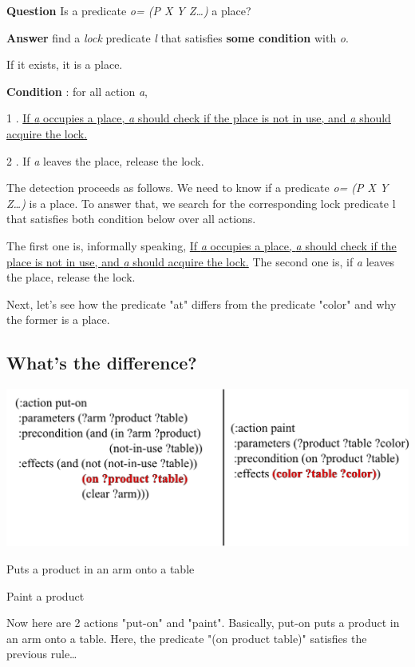 \textbf{Question} Is a predicate \emph{o= (P X Y Z\ldots{})} a place?

\textbf{Answer} find a \emph{lock} predicate \emph{l} that satisfies \textbf{some condition} with \emph{o}.

If it exists, it is a place.

\textbf{Condition} : for all action \emph{a},

1 . \uline{If \emph{a} occupies a place, \emph{a} should check if the place is not in use, and \emph{a}
should acquire the lock.}

2 . If \emph{a} leaves the place, release the lock.

\begin{resume}
The detection proceeds as follows.
We need to know if a predicate \emph{o= (P X Y Z\ldots{})} is a place.
To answer that, 
we search for the corresponding lock predicate l
that satisfies both condition below over all actions.

The first one is, informally speaking, \uline{If \emph{a} occupies a place, \emph{a} should check
 if the place is not in use, and \emph{a} should acquire the lock.} The second one is,
 if \emph{a} leaves the place, release the lock.

Next, let's see how the predicate "at" differs from the predicate "color"
and why the former is a place.
\end{resume}

\subsection{What's the difference?}
\label{sec-7-3}
\includegraphics[width=\textwidth]{img/place-non-place1.png}

Puts a product in an arm onto a table

\begin{alignright}
Paint a product
\end{alignright}

\begin{resume}
Now here are 2 actions "put-on" and "paint".
Basically, put-on puts a product in an arm onto a table.
Here, the predicate "(on product table)" satisfies the previous rule\ldots{}
\end{resume}

